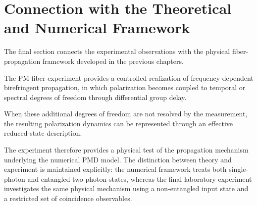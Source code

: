 
\section{Connection with the Theoretical and Numerical Framework}
\label{sec:experimental_theoretical_connection}

The final section connects the experimental observations with the physical
fiber-propagation framework developed in the previous chapters.

The PM-fiber experiment provides a controlled realization of
frequency-dependent birefringent propagation, in which polarization becomes
coupled to temporal or spectral degrees of freedom through differential group
delay.

When these additional degrees of freedom are not resolved by the measurement,
the resulting polarization dynamics can be represented through an effective
reduced-state description.

The experiment therefore provides a physical test of the propagation mechanism
underlying the numerical PMD model. The distinction between theory and experiment
is maintained explicitly: the numerical framework treats both single-photon and
entangled two-photon states, whereas the final laboratory experiment investigates
the same physical mechanism using a non-entangled input state and a restricted
set of coincidence observables.